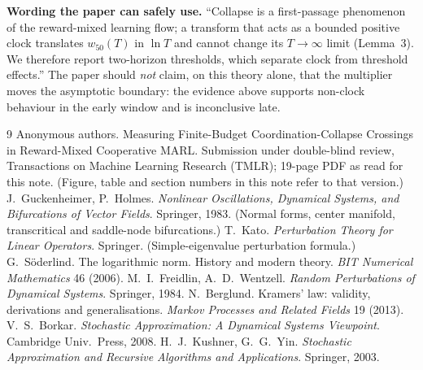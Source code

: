 \documentclass[11pt]{article}
\theoremstyle{definition}
\theoremstyle{remark}
\newcommand{\wfifty}{w_{50}}
\begin{document}
\textbf{Wording the paper can safely use.} ``Collapse is a first-passage phenomenon of the reward-mixed learning flow; a transform that acts as a bounded positive clock translates $\wfifty(T)$ in $\ln T$ and cannot change its $T\to\infty$ limit (Lemma~3). We therefore report two-horizon thresholds, which separate clock from threshold effects.'' The paper should \emph{not} claim, on this theory alone, that the multiplier moves the asymptotic boundary: the evidence above supports non-clock behaviour in the early window and is inconclusive late.

\begin{thebibliography}{9}
 Anonymous authors. Measuring Finite-Budget Coordination-Collapse Crossings in Reward-Mixed Cooperative MARL. Submission under double-blind review, Transactions on Machine Learning Research (TMLR); 19-page PDF as read for this note. (Figure, table and section numbers in this note refer to that version.)
 J.~Guckenheimer, P.~Holmes. \emph{Nonlinear Oscillations, Dynamical Systems, and Bifurcations of Vector Fields}. Springer, 1983. (Normal forms, center manifold, transcritical and saddle-node bifurcations.)
 T.~Kato. \emph{Perturbation Theory for Linear Operators}. Springer. (Simple-eigenvalue perturbation formula.)
 G.~S\"oderlind. The logarithmic norm. History and modern theory. \emph{BIT Numerical Mathematics} 46 (2006).
 M.~I.~Freidlin, A.~D.~Wentzell. \emph{Random Perturbations of Dynamical Systems}. Springer, 1984.
 N.~Berglund. Kramers' law: validity, derivations and generalisations. \emph{Markov Processes and Related Fields} 19 (2013).
 V.~S.~Borkar. \emph{Stochastic Approximation: A Dynamical Systems Viewpoint}. Cambridge Univ.\ Press, 2008.
 H.~J.~Kushner, G.~G.~Yin. \emph{Stochastic Approximation and Recursive Algorithms and Applications}. Springer, 2003.
\end{thebibliography}
\end{document}
